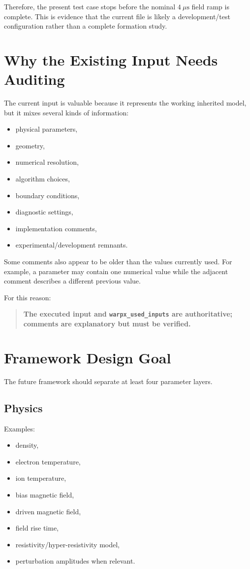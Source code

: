 \documentclass[11pt,a4paper]{article}
\begin{document}
Therefore, the present test case stops before the nominal \(4~\mu\mathrm{s}\) field ramp is complete. This is evidence that the current file is likely a development/test configuration rather than a complete formation study.

\section{Why the Existing Input Needs Auditing}

The current input is valuable because it represents the working inherited model, but it mixes several kinds of information:

\begin{itemize}
    \item physical parameters,
    \item geometry,
    \item numerical resolution,
    \item algorithm choices,
    \item boundary conditions,
    \item diagnostic settings,
    \item implementation comments,
    \item experimental/development remnants.
\end{itemize}

Some comments also appear to be older than the values currently used. For example, a parameter may contain one numerical value while the adjacent comment describes a different previous value.

For this reason:

\begin{quote}
\textbf{The executed input and \texttt{warpx\_used\_inputs} are authoritative; comments are explanatory but must be verified.}
\end{quote}

\section{Framework Design Goal}

The future framework should separate at least four parameter layers.

\subsection{Physics}

Examples:

\begin{itemize}
    \item density,
    \item electron temperature,
    \item ion temperature,
    \item bias magnetic field,
    \item driven magnetic field,
    \item field rise time,
    \item resistivity/hyper-resistivity model,
    \item perturbation amplitudes when relevant.
\end{itemize}
\end{document}
